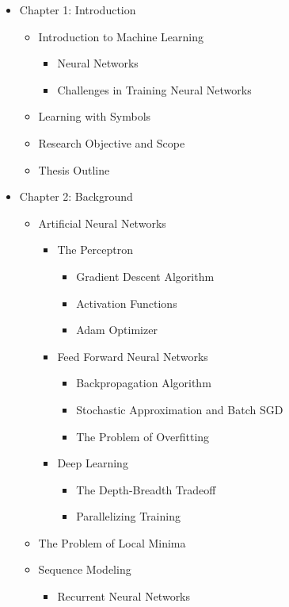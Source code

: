 \documentclass{article}
\begin{document}
	\begin{itemize}
		\item Chapter 1: Introduction
		\begin{itemize}
			\item Introduction to Machine Learning
			\begin{itemize}
				\item Neural Networks
				\item Challenges in Training Neural Networks
			\end{itemize}
			\item Learning with Symbols
			\item Research Objective and Scope
			\item Thesis Outline
		\end{itemize}
		\item Chapter 2: Background
		\begin{itemize}
			\item Artificial Neural Networks
			\begin{itemize}
				\item The Perceptron
				\begin{itemize}
					\item Gradient Descent Algorithm
					\item Activation Functions
					\item Adam Optimizer
				\end{itemize}
				\item Feed Forward Neural Networks
				\begin{itemize}
					\item Backpropagation Algorithm
					\item Stochastic Approximation and Batch SGD
					\item The Problem of Overfitting 
				\end{itemize}
				\item Deep Learning
				\begin{itemize}
					\item The Depth-Breadth Tradeoff
					\item Parallelizing Training
				\end{itemize}
			\end{itemize}
			\item The Problem of Local Minima
			\item Sequence Modeling
			\begin{itemize}
				\item Recurrent Neural Networks
				\begin{itemize}

\end{itemize}
\end{itemize}
\end{itemize}
\end{itemize}
\end{document}
